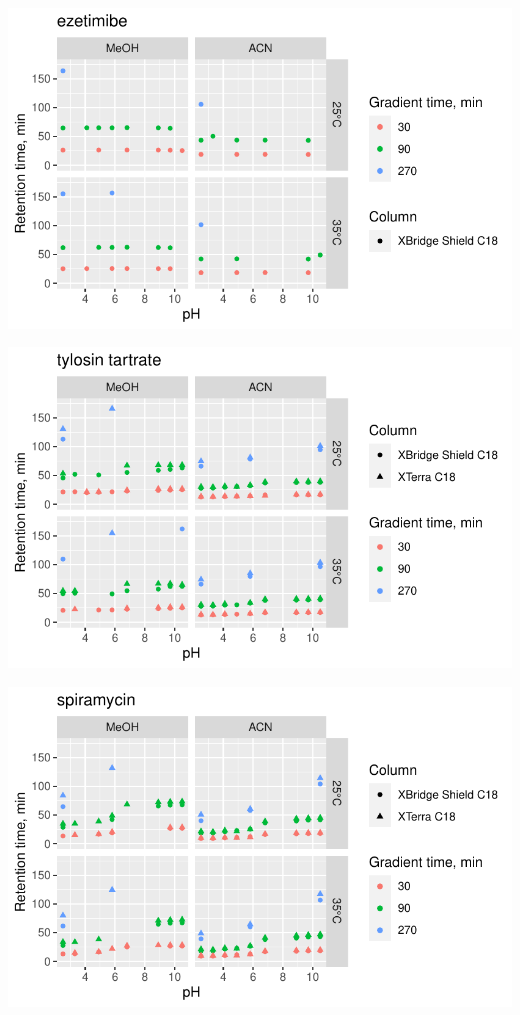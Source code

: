 \documentclass[
  letterpaper,
  DIV=11,
  numbers=noendperiod]{scrreprt}
\begin{document}
\includegraphics{index_files/figure-pdf/unnamed-chunk-4-177.pdf}

\includegraphics{index_files/figure-pdf/unnamed-chunk-4-178.pdf}

\includegraphics{index_files/figure-pdf/unnamed-chunk-4-179.pdf}
\end{document}
